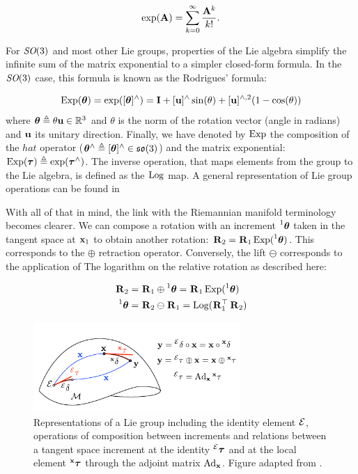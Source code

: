 \begin{equation}
    \exp({\bf A}) = \sum_{k=0}^{\infty} \frac{{\bf A}^k}{k!}.
\end{equation}

For $\textit{SO}(3)$ and most other Lie groups, properties of the Lie algebra simplify the infinite sum of the matrix exponential to a simpler closed-form formula. 
In the $\textit{SO}(3)$ case, this formula is known as the Rodrigues' formula:

\begin{equation}
    \operatorname*{Exp}({\bm \theta}) = \exp([{\bm \theta}]^\wedge) = {\bf I} + [{\bf u}]^\wedge\sin(\theta) + [{\bf u}]^{\wedge,2}(1 - \cos(\theta))
\end{equation}
%
where ${\bm \theta} \triangleq \theta {\bf u} \in \mathbb{R}^3$ and $\theta$ is the norm of the rotation vector (angle in radians) and ${\bf u}$ its unitary direction.
Finally, we have denoted by $\operatorname*{Exp}$ the composition of the $hat$ operator (${\bm \theta}^\wedge \triangleq [{\bm \theta}]^\wedge \in {\mathfrak {so}}(3)$) and the matrix exponential: $\operatorname*{Exp}({\bm \tau}) \triangleq \exp({\bm \tau}^\wedge)$. 
The inverse operation, that maps elements from the group to the Lie algebra, is defined as the $\operatorname*{Log}$ map. A general representation of
Lie group operations can be found in 

With all of that in mind, the link with the Riemannian manifold terminology becomes clearer. We can compose a rotation with
an increment $\prescript{1}{}{{\bm \theta}}$ taken in the tangent space at ${\bf x}_1$ to obtain another rotation: $\prescript{}{}{{\bf R}}_{2} = \prescript{}{}{{\bf R}}_{1}\operatorname*{Exp}(\prescript{1}{}{{\bm \theta}})$.
This corresponds to the $\oplus$ retraction operator. Conversely, the lift $\ominus$ corresponds to the application of The
logarithm on the relative rotation as described here:

\begin{align}
    \prescript{}{}{{\bf R}}_{2} &= \prescript{}{}{{\bf R}}_{1}\oplus \prescript{1}{}{{\bm \theta}} = \prescript{}{}{{\bf R}}_{1} \operatorname*{Exp}(\prescript{1}{}{{\bm \theta}})  \\ 
    \prescript{1}{}{{\bm \theta}} &= \prescript{}{}{{\bf R}}_{2}\ominus \prescript{}{}{{\bf R}}_{1} = \operatorname*{Log}(\prescript{}{}{{\bf R}}_{1}^{\top}\prescript{}{}{{\bf R}}_{2}) 
\end{align}

\begin{figure}[b]
    \centering
    \includegraphics[width=0.7\textwidth]{figures/lie_group.pdf}
    \caption{Representations of a Lie group including the identity element $\mathcal{E}$, operations of composition
    between increments and relations between a tangent space increment at the identity $\prescript{\mathcal{E}}{}{{\bm \tau}}$ 
    and at the local element $\prescript{{\bf x}}{}{{\bm \tau}}$ through the adjoint matrix $\text{Ad}_{{\bf x}}$. Figure adapted from \cite{sola2018micro}.}
    \label{fig:lie_group} 
\end{figure}

